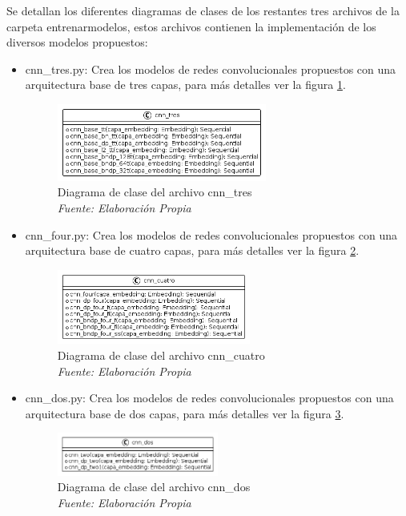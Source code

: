 Se detallan los diferentes diagramas de clases de los restantes tres archivos de la carpeta entrenarmodelos, estos archivos contienen la implementación de los diversos modelos propuestos:

\begin{itemize}

\item cnn\_tres.py: Crea los modelos de redes convolucionales propuestos con una arquitectura base de tres capas, para más detalles ver la figura \ref{fig:uml9}.

\begin{figure}[h!]
	\includegraphics[width=0.65\textwidth]{capitulo5/figuras/fig9.png}
	\caption[Diagrama de clase del archivo cnn\_tres]{Diagrama de clase del archivo cnn\_tres
		\\\textit{Fuente: Elaboración Propia}}
	\label{fig:uml9}
\end{figure}

\item cnn\_four.py: Crea los modelos de redes convolucionales propuestos con una arquitectura base de cuatro capas, para más detalles ver la figura \ref{fig:uml10}.

\begin{figure}[h!]
	\includegraphics[width=0.6\textwidth]{capitulo5/figuras/fig10.png}
	\caption[Diagrama de clase del archivo cnn\_cuatro]{Diagrama de clase del archivo cnn\_cuatro
		\\\textit{Fuente: Elaboración Propia}}
	\label{fig:uml10}
\end{figure}

\item cnn\_dos.py: Crea los modelos de redes convolucionales propuestos con una arquitectura base de dos capas, para más detalles ver la figura \ref{fig:uml11}.

\begin{figure}[h!]
	\includegraphics[width=0.5\textwidth]{capitulo5/figuras/fig11.png}
	\caption[Diagrama de clase del archivo cnn\_dos]{Diagrama de clase del archivo cnn\_dos
		\\\textit{Fuente: Elaboración Propia}}
	\label{fig:uml11}
\end{figure}

\end{itemize}

